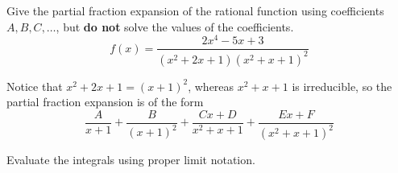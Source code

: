 \documentclass[12pt,answers]{exam}
\begin{document}
\begin{questions}

\question[6]
Give the partial fraction expansion of the rational function using coefficients $A, B, C, \ldots$, but \textbf{do not} solve the values of the coefficients.
\[
    f(x) = \frac{2x^4 - 5x + 3}{(x^2+2x+1)(x^2+x+1)^2}
\]
\begin{solution}
    Notice that $x^2+2x+1 = (x+1)^2$, whereas $x^2+x+1$ is irreducible, so
    the partial fraction expansion is of the form
    \[
        \frac{A}{x+1} + \frac{B}{(x+1)^2} + \frac{Cx+D}{x^2+x+1} + \frac{Ex+F}{(x^2+x+1)^2}
    \]
\end{solution}

\newpage
\question 
Evaluate the integrals using proper limit notation.
\begin{parts}

\end{parts}
\end{questions}
\end{document}
